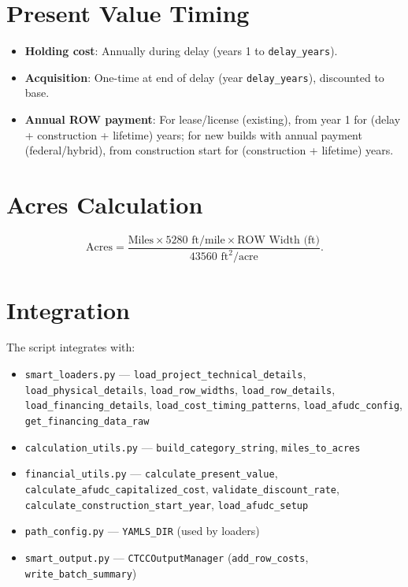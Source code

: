 \documentclass[ctcc_full_documentation.tex]{subfiles}
\begin{document}
\section{Present Value Timing}

\begin{itemize}
    \item \textbf{Holding cost}: Annually during delay (years 1 to \texttt{delay\_years}).
    \item \textbf{Acquisition}: One-time at end of delay (year \texttt{delay\_years}), discounted to base.
    \item \textbf{Annual ROW payment}: For lease/license (existing), from year 1 for (delay + construction + lifetime) years; for new builds with annual payment (federal/hybrid), from construction start for (construction + lifetime) years.
\end{itemize}

\section{Acres Calculation}

\[
\text{Acres} = \frac{\text{Miles} \times 5280 \text{ ft/mile} \times \text{ROW Width (ft)}}{43560 \text{ ft}^2/\text{acre}}.
\]

\section{Integration}

The script integrates with:
\begin{itemize}
    \item \texttt{smart\_loaders.py} --- \texttt{load\_project\_technical\_details}, \texttt{load\_physical\_details}, \texttt{load\_row\_widths}, \texttt{load\_row\_details}, \texttt{load\_financing\_details}, \texttt{load\_cost\_timing\_patterns}, \texttt{load\_afudc\_config}, \texttt{get\_financing\_data\_raw}
    \item \texttt{calculation\_utils.py} --- \texttt{build\_category\_string}, \texttt{miles\_to\_acres}
    \item \texttt{financial\_utils.py} --- \texttt{calculate\_present\_value}, \texttt{calculate\_afudc\_capitalized\_cost}, \texttt{validate\_discount\_rate}, \texttt{calculate\_construction\_start\_year}, \texttt{load\_afudc\_setup}
    \item \texttt{path\_config.py} --- \texttt{YAMLS\_DIR} (used by loaders)
    \item \texttt{smart\_output.py} --- \texttt{CTCCOutputManager} (\texttt{add\_row\_costs}, \texttt{write\_batch\_summary})
\end{itemize}
\end{document}
